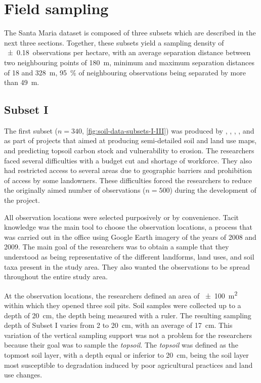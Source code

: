 \tocless\section{Field sampling}

The Santa Maria dataset is composed of three subsets which are described in the next three 
sections. Together, these subsets yield a sampling density of \num{\pm0.18}~observations per 
hectare, with an average separation distance between two neighbouring points of \SI{180}{\metre}, 
minimum and maximum separation distances of \num{18} and \SI{328}{\metre}, \SI{95}{\percent} of 
neighbouring observations being separated by more than \SI{49}{\metre}.

\tocless\subsection{Subset I}

The first subset ($n = 340$, \autoref{fig:soil-data-subsets-I-III}) was produced by 
, , , 
, and  as part of projects that aimed at 
producing semi-detailed soil and land use maps, and predicting topsoil carbon stock and vulnerability to 
erosion. The researchers faced several difficulties with a budget cut and shortage of workforce. They also had 
restricted access to several areas due to geographic barriers and prohibition of 
access by some landowners. These difficulties forced the researchers to reduce the originally aimed number of 
observations ($n = 500$) during the development of the project.

All observation locations were selected purposively or by convenience. Tacit knowledge was the main tool
to choose the observation locations, a process that was carried out in the office using Google 
Earth\textregistered{} imagery of the years of 2008 and 2009. The main goal of the researchers was 
to obtain a sample that they understood as being representative of the different landforms, land uses, and 
soil taxa present in the study area. They also wanted the observations to be spread throughout the entire 
study area.

At the observation locations, the researchers defined an area of \SI{\pm100}{\metre\squared} within which
they opened three soil pits. Soil samples were collected up to a depth of \SI{20}{\centi\metre}, the depth 
being measured with a ruler. The resulting sampling depth of Subset I varies from \num{2} to 
\SI{20}{\centi\metre}, with an average of \SI{17}{\centi\metre}. This variation of the vertical sampling 
support was not a problem for the researchers because their goal was to sample the \emph{topsoil}. The
\emph{topsoil} was defined as the topmost soil layer, with a depth equal or inferior to 
\SI{20}{\centi\metre}, being the soil layer most susceptible to degradation induced by poor agricultural 
practices and land use changes.

